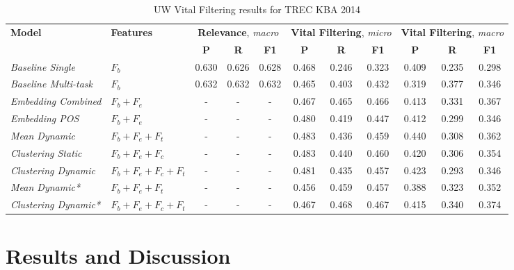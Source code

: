 \documentclass{article}
\begin{document}
\begin{table}[tb]
{\small
\begin{center}
\begin{tabular}{llccccccccc} 
\toprule
  \multirow{2}{*}{\textbf{Model}} & 
  \multirow{2}{*}{\textbf{Features}} & 
  \multicolumn{3}{c}{\textbf{Relevance}, \emph{macro}} & 
  \multicolumn{3}{c}{\textbf{Vital Filtering}, \emph{micro}} &
  \multicolumn{3}{c}{\textbf{Vital Filtering}, \emph{macro}}
\\ 
  \cmidrule(lr){3-5}
  \cmidrule(lr){6-8}
  \cmidrule(lr){9-11}
&   & 
  \textbf{P} & \textbf{R} & \textbf{F1} & 
  \textbf{P} & \textbf{R} & \textbf{F1} & 
  \textbf{P} & \textbf{R} & \textbf{F1} \\ 
\midrule
{\textit{Baseline Single}} & $F_b$ &
	0.630 & 0.626 & 0.628 & 
	0.468 & 0.246 & 0.323 &
  0.409 & 0.235 & 0.298 \\
{\textit{Baseline Multi-task}} & $F_b$ &
	0.632 & 0.632 & 0.632 & 
	0.465 & 0.403 & 0.432 &
	0.319 & 0.377 & 0.346 \\
{\textit{Embedding Combined}} & $F_b+F_e$ & 
	- & - & - & 
	0.467 & 0.465 & 0.466 &
	0.413 & 0.331 & 0.367 \\
{\textit{Embedding POS}} & $F_b+F_e$ & 
	- & - & - & 
	0.480 & 0.419 & 0.447 &
	0.412 & 0.299 & 0.346 \\
{\textit{Mean Dynamic}} & $F_b+F_e+F_t$ & 
	- & - & - & 
	0.483 & 0.436 & 0.459 &
	0.440 & 0.308 & 0.362 \\
{\textit{Clustering Static}} & $F_b+F_e+F_c$ & 
	- & - & - & 
	0.483 & 0.440 & 0.460 &
	0.420 & 0.306 & 0.354 \\
{\textit{Clustering Dynamic}} & $F_b+F_e+F_c+F_t$ & 
	- & - & - & 
  0.481 & 0.435 & 0.457 &
	0.423 & 0.293 & 0.346 \\
\midrule
{\textit{Mean Dynamic*}} & $F_b+F_e+F_t$ & 
  - & - & - & 
  0.456 & 0.459 & 0.457 &
  0.388 & 0.323 & 0.352 \\
{\textit{Clustering Dynamic*}} & $F_b+F_e+F_c+F_t$ & 
  - & - & - & 
  0.467 & 0.468 & 0.467 &
  0.415 & 0.340 & 0.374 \\ 
\bottomrule
\end{tabular}
\end{center}
}
\caption{UW Vital Filtering results for TREC KBA 2014}
\label{resMacro}
\end{table}

\section{Results and Discussion}
\end{document}
